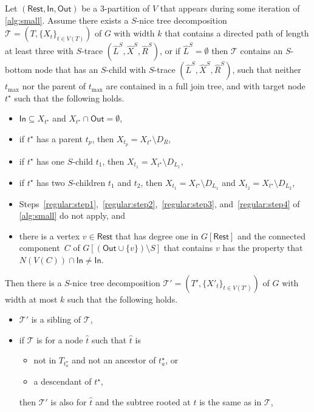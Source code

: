\documentclass[a4paper,UKenglish,cleveref, autoref, thm-restate, numberwithinsect]{lipics-v2021}
\newcommand{\slim}{\text{slim}\xspace}
\newcommand{\topheavy}{\text{top-heavy}\xspace}
\newcommand{\In}{\mathsf{In}}
\newcommand{\Out}{\mathsf{Out}}
\newcommand{\Rest}{\mathsf{Rest}}
\begin{document}
\begin{lemma}\label{lem:regularstep5}
Let $(\Rest,\In,\Out)$ be a 3-partition of $V$ that appears during some iteration of \cref{alg:small}. 
Assume there exists a \slim $S$-nice tree decomposition $\mathcal{T}=(T,\{X_t\}_{t\in V(T)})$ of $G$ with width $k$ that contains a directed path of length at least three with $S$-trace $(\hat{L}^S, \hat{X}^S, \hat{R}^S)$, or if $\hat{L}^S=\emptyset$ then $\mathcal{T}$ contains an $S$-bottom node that has an $S$-child with $S$-trace $(\hat{L}^S, \hat{X}^S, \hat{R}^S)$, such that neither $t_{\max}$ nor the parent of $t_{\max}$ are contained in a full join tree, and with target node ${t^\star}$ such that the following holds.
\begin{itemize}
\item $\In\subseteq X_{t^\star}$ and $X_{t^\star}\cap \Out=\emptyset$, 
                \item if $t^\star$ has a parent $t_p$, then $X_{t_p}=X_{t^\star}\setminus D_R$, 
    \item if $t^\star$ has one $S$-child $t_1$, then $X_{t_1}=X_{t^\star}\setminus D_{L_1}$, 
    \item if $t^\star$ has two $S$-children $t_1$ and $t_2$, then $X_{t_1}=X_{t^\star}\setminus D_{L_1}$ and $X_{t_2}=X_{t^\star}\setminus D_{L_2}$, 
    \item Steps~\ref{regular:step1},~\ref{regular:step2},~\ref{regular:step3}, and~\ref{regular:step4} of \cref{alg:small} do not apply, and
    \item there is a vertex $v\in\Rest$ that has degree one in $G[\Rest]$ and the connected component~$C$ of $G[(\Out\cup\{v\})\setminus S]$ that contains $v$ has the property that $N(V(C))\cap \In\neq \In$.
\end{itemize} 
Then there is a \slim $S$-nice tree decomposition $\mathcal{T}'=(T',\{X'_t\}_{t\in V(T')})$ of $G$ with width at most $k$ 
such that the following holds.
\begin{itemize}
\item $\mathcal{T}'$ is a sibling of $\mathcal{T}$,
\item if $\mathcal{T}$ is \topheavy for a node $\hat{t}$ such that $\hat{t}$ is
\begin{itemize}
    \item not in $T_{t^\star_a}$ and not an ancestor of $t^\star_a$, or
    \item a descendant of $t^\star$,
\end{itemize}
then $\mathcal{T}'$ is also \topheavy for $\hat{t}$ and the subtree rooted at $\hat{t}$ is the same as in $\mathcal{T}$,

\end{itemize}
\end{lemma}
\end{document}
